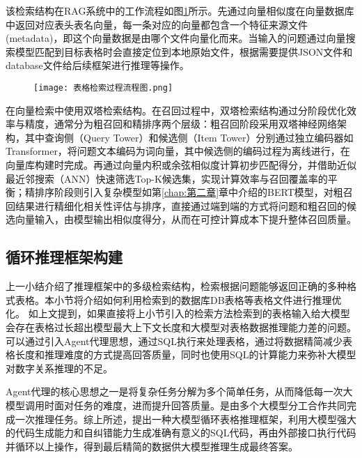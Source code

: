 该检索结构在RAG系统中的工作流程如图\ref{fig:4-4}所示。先通过向量相似度在向量数据库中返回对应表头表名向量，每一条对应的向量都包含一个特征来源文件(metadata)，即这个向量数据是由哪个文件向量化而来。当输入的问题通过向量搜索模型匹配到目标表格时会直接定位到本地原始文件，根据需要提供JSON文件和database文件给后续框架进行推理等操作。
\begin{figure}[h]
    \centering
    \texttt{[image: 表格检索过程流程图.png]}
    \label{fig:4-4}
\end{figure}
在向量检索中使用双塔检索结构\cite{bahdanau2015neural,sutskever2014sequence,fan2018hierarchical,holtzmancurious}。在召回过程中，双塔检索结构通过分阶段优化效率与精度，通常分为粗召回和精排序两个层级：粗召回阶段采用双塔神经网络架构，其中查询侧（Query Tower）和候选侧（Item Tower）分别通过独立编码器如Transformer，将问题文本编码为词向量，其中候选侧的编码过程为离线进行，在向量库构建时完成。再通过向量内积或余弦相似度计算初步匹配得分，并借助近似最近邻搜索（ANN）快速筛选Top-K候选集，实现计算效率与召回覆盖率的平衡；精排序阶段则引入复杂模型如第\ref{chap:第二章}章中介绍的BERT模型，对粗召回结果进行精细化相关性评估与排序，直接通过端到端的方式将问题和粗召回的候选向量输入，由模型输出相似度得分，从而在可控计算成本下提升整体召回质量。

\subsection{循环推理框架构建}
上一小结介绍了推理框架中的多级检索结构，检索根据问题能够返回正确的多种格式表格。本小节将介绍如何利用检索到的数据库DB表格等表格文件进行推理优化。
如上文提到，如果直接将上小节引入的检索方法检索到的表格输入给大模型会存在表格过长超出模型最大上下文长度和大模型对表格数据推理能力差的问题。可以通过引入Agent代理思想，通过SQL执行来处理表格，通过将数据精简减少表格长度和推理难度的方式提高回答质量，同时也使用SQL的计算能力来弥补大模型对数字关系推理的不足。

Agent代理的核心思想之一是将复杂任务分解为多个简单任务，从而降低每一次大模型调用时面对任务的难度，进而提升回答质量。是由多个大模型分工合作共同完成一次推理任务。综上所述，提出一种大模型循环表格推理框架，利用大模型强大的代码生成能力和自纠错能力生成准确有意义的SQL代码，再由外部接口执行代码并循环以上操作，得到最后精简的数据供大模型推理生成最终答案。

